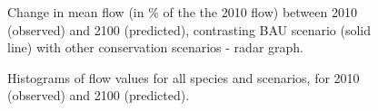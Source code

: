 {%
\begin{figure}[h!]
 \caption{Change in mean flow (in \% of the the 2010 flow) between 2010 (observed) and 2100 (predicted), contrasting BAU scenario (solid line) with other conservation scenarios - radar graph.}
 \label{fig:flow_radar_2}
\end{figure}

\begin{figure}[h!]
 \caption{Histograms of flow values for all species and scenarios, for 2010 (observed) and 2100 (predicted).}
 \label{fig:hist_2}
\end{figure}

}
